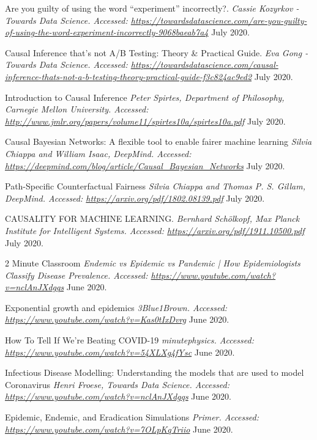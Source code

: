 \begin{thebibliography}{1}
 Are you guilty of using the word “experiment” incorrectly?. {\em Cassie Kozyrkov - Towards Data Science. Accessed:  \url{https://towardsdatascience.com/are-you-guilty-of-using-the-word-experiment-incorrectly-9068baeab7a4}} July 2020.

 Causal Inference that’s not A/B Testing: Theory & Practical Guide. {\em Eva Gong - Towards Data Science. Accessed:  \url{https://towardsdatascience.com/causal-inference-thats-not-a-b-testing-theory-practical-guide-f3c824ac9ed2}} July 2020.

Introduction to Causal Inference
{\em Peter Spirtes, Department of Philosophy, Carnegie Mellon University. Accessed:  \url{http://www.jmlr.org/papers/volume11/spirtes10a/spirtes10a.pdf}} July 2020.

Causal Bayesian Networks: A flexible tool to enable fairer machine learning
{\em Silvia Chiappa and William Isaac, DeepMind. Accessed:  \url{https://deepmind.com/blog/article/Causal_Bayesian_Networks}} July 2020.

Path-Specific Counterfactual Fairness
{\em Silvia Chiappa and Thomas P. S. Gillam, DeepMind. Accessed:  \url{https://arxiv.org/pdf/1802.08139.pdf}} July 2020.

 CAUSALITY FOR MACHINE LEARNING. {\em Bernhard Schölkopf, Max Planck Institute for Intelligent Systems. Accessed:  \url{https://arxiv.org/pdf/1911.10500.pdf}} July 2020.

 2 Minute Classroom {\em Endemic vs Epidemic vs Pandemic | How Epidemiologists Classify Disease Prevalence. Accessed:  \url{https://www.youtube.com/watch?v=nclAnJXdgqs}} June 2020.

 Exponential growth and epidemics {\em 3Blue1Brown. Accessed:  \url{https://www.youtube.com/watch?v=Kas0tIxDvrg}} June 2020.

 How To Tell If We're Beating COVID-19 {\em 
minutephysics. Accessed:  \url{https://www.youtube.com/watch?v=54XLXg4fYsc}} June 2020.

 Infectious Disease Modelling: Understanding the models that are used to model Coronavirus {\em Henri Froese, Towards Data Science. Accessed:  \url{https://www.youtube.com/watch?v=nclAnJXdgqs}} June 2020.

 Epidemic, Endemic, and Eradication Simulations {\em Primer. Accessed:  \url{https://www.youtube.com/watch?v=7OLpKqTriio}} June 2020.


\end{thebibliography}
